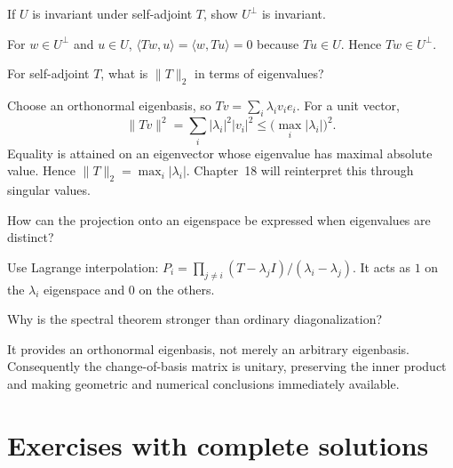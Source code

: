 \begin{problem}\label{prob:i16-problem-09}
If $U$ is invariant under self-adjoint $T$, show $U^\perp$ is invariant.
\end{problem}
\begin{solution}
For $w\in U^\perp$ and $u\in U$, $\langle Tw,u\rangle=\langle w,Tu\rangle=0$ because $Tu\in U$. Hence $Tw\in U^\perp$.
\end{solution}

\begin{problem}\label{prob:i16-problem-10}
For self-adjoint $T$, what is $\|T\|_2$ in terms of eigenvalues?
\end{problem}
\begin{solution}
Choose an orthonormal eigenbasis, so $Tv=\sum_i\lambda_i v_i e_i$. For a unit vector,
\[
\|Tv\|^2=\sum_i|\lambda_i|^2|v_i|^2\le \bigl(\max_i|\lambda_i|\bigr)^2.
\]
Equality is attained on an eigenvector whose eigenvalue has maximal absolute value. Hence $\|T\|_2=\max_i|\lambda_i|$. Chapter~18 will reinterpret this through singular values.
\end{solution}

\begin{problem}\label{prob:i16-problem-11}
How can the projection onto an eigenspace be expressed when eigenvalues are distinct?
\end{problem}
\begin{solution}
Use Lagrange interpolation: $P_i=\prod_{j\ne i}(T-\lambda_jI)/(\lambda_i-\lambda_j)$. It acts as $1$ on the $\lambda_i$ eigenspace and $0$ on the others.
\end{solution}

\begin{problem}\label{prob:i16-problem-12}
Why is the spectral theorem stronger than ordinary diagonalization?
\end{problem}
\begin{solution}
It provides an orthonormal eigenbasis, not merely an arbitrary eigenbasis. Consequently the change-of-basis matrix is unitary, preserving the inner product and making geometric and numerical conclusions immediately available.
\end{solution}


\section{Exercises with complete solutions}

